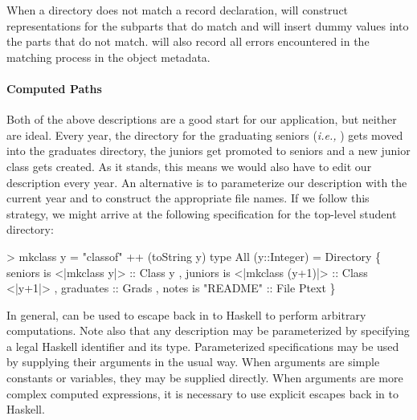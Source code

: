 When a directory does not match a record declaration, \forest{} will
construct representations for the subparts that do match and will insert dummy values
into the parts that do not match.  \forest{} will also record all errors encountered in the
matching process in the object metadata.

\paragraph*{Computed Paths}
\label{sec:computed-paths}

Both of the above descriptions are a good start for our application, but neither
are ideal.  Every year, the directory for the graduating seniors 
({\em i.e.,} ) gets moved into the graduates directory,
the juniors get promoted to seniors and a new junior class gets created.
As it stands, this means we would also have to edit our description every year.
An alternative is to parameterize our description with the current year and
to construct the appropriate file names.  If we follow this strategy,
we might arrive at the following specification for the top-level student directory:
\begin{code}
> mkclass y = "classof" ++ (toString y)
\mbox{}
type All (y::Integer) = Directory
  \{ seniors is <|mkclass y|> :: Class y
  , juniors is <|mkclass (y+1)|> :: Class <|y+1|>
  , graduates :: Grads
  , notes is "README" :: File Ptext
  \}
\end{code}
In general,  can be used to escape back in to
Haskell to perform arbitrary computations.  Note also that any description
may be parameterized by specifying a legal Haskell identifier and its type.
Parameterized specifications may be used by supplying their arguments
in the usual way.  When arguments are simple constants or variables,
they may be supplied directly.  When arguments are more complex
computed expressions, it is necessary to use explicit escapes back 
in to Haskell.

